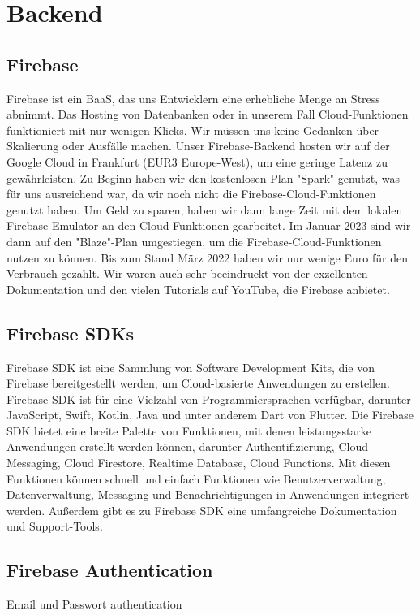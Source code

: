 \section{Backend}

\subsection{Firebase}
Firebase ist ein BaaS, das uns Entwicklern eine erhebliche Menge an Stress abnimmt. Das Hosting von Datenbanken oder in unserem Fall Cloud-Funktionen funktioniert mit nur wenigen Klicks. Wir müssen uns keine Gedanken über Skalierung oder Ausfälle machen. Unser Firebase-Backend hosten wir auf der Google Cloud in Frankfurt (EUR3 Europe-West), um eine geringe Latenz zu gewährleisten. Zu Beginn haben wir den kostenlosen Plan "Spark" genutzt, was für uns ausreichend war, da wir noch nicht die Firebase-Cloud-Funktionen genutzt haben. Um Geld zu sparen, haben wir dann lange Zeit mit dem lokalen Firebase-Emulator an den Cloud-Funktionen gearbeitet. Im Januar 2023 sind wir dann auf den "Blaze"-Plan umgestiegen, um die Firebase-Cloud-Funktionen nutzen zu können. Bis zum Stand März 2022 haben wir nur wenige Euro für den Verbrauch gezahlt. Wir waren auch sehr beeindruckt von der exzellenten Dokumentation und den vielen Tutorials auf YouTube, die Firebase anbietet.


\subsection{Firebase SDKs}
\author{Sandin Habibovic}
Firebase SDK ist eine Sammlung von Software Development Kits, die von Firebase bereitgestellt werden, um Cloud-basierte Anwendungen zu erstellen. 
Firebase SDK ist für eine Vielzahl von Programmiersprachen verfügbar, darunter JavaScript, Swift, Kotlin, Java und unter anderem Dart von Flutter.
Die Firebase SDK bietet eine breite Palette von Funktionen, mit denen leistungsstarke Anwendungen erstellt werden können, darunter Authentifizierung, Cloud Messaging, Cloud Firestore, Realtime Database, Cloud Functions. Mit diesen Funktionen können schnell und einfach Funktionen wie Benutzerverwaltung, Datenverwaltung, Messaging und Benachrichtigungen in Anwendungen integriert werden. Außerdem gibt es zu Firebase SDK eine umfangreiche Dokumentation und Support-Tools.

\subsection{Firebase Authentication}
\author{Sandin Habibovic}
Email und Passwort authentication

